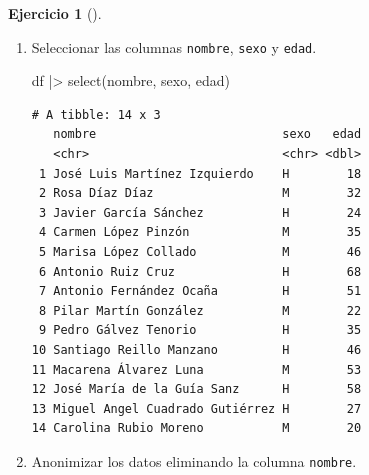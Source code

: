 \documentclass[
  a4paper,
]{scrreport}
\newenvironment{Shaded}{\begin{snugshade}}{\end{snugshade}}
\newcommand{\FunctionTok}[1]{\textcolor[rgb]{0.28,0.35,0.67}{#1}}
\newcommand{\NormalTok}[1]{\textcolor[rgb]{0.00,0.23,0.31}{#1}}
\newcommand{\SpecialCharTok}[1]{\textcolor[rgb]{0.37,0.37,0.37}{#1}}
\theoremstyle{definition}
\newtheorem{exercise}{Ejercicio}[chapter]
\theoremstyle{remark}
\begin{document}
\begin{exercise}[]
\begin{enumerate}
\begin{tcolorbox}
  \end{tcolorbox}
\item
  Seleccionar las columnas \texttt{nombre}, \texttt{sexo} y
  \texttt{edad}.

  \begin{tcolorbox}[enhanced jigsaw, coltitle=black, left=2mm, colback=white, leftrule=.75mm, toptitle=1mm, breakable, bottomrule=.15mm, titlerule=0mm, bottomtitle=1mm, title=\textcolor{quarto-callout-tip-color}{\faLightbulb}\hspace{0.5em}{Solución}, arc=.35mm, toprule=.15mm, rightrule=.15mm, colframe=quarto-callout-tip-color-frame, opacityback=0, colbacktitle=quarto-callout-tip-color!10!white, opacitybacktitle=0.6]

\begin{Shaded}
\begin{Highlighting}[]
\NormalTok{df }\SpecialCharTok{|\textgreater{}}
    \FunctionTok{select}\NormalTok{(nombre, sexo, edad)}
\end{Highlighting}
\end{Shaded}

\begin{verbatim}
# A tibble: 14 x 3
   nombre                          sexo   edad
   <chr>                           <chr> <dbl>
 1 José Luis Martínez Izquierdo    H        18
 2 Rosa Díaz Díaz                  M        32
 3 Javier García Sánchez           H        24
 4 Carmen López Pinzón             M        35
 5 Marisa López Collado            M        46
 6 Antonio Ruiz Cruz               H        68
 7 Antonio Fernández Ocaña         H        51
 8 Pilar Martín González           M        22
 9 Pedro Gálvez Tenorio            H        35
10 Santiago Reillo Manzano         H        46
11 Macarena Álvarez Luna           M        53
12 José María de la Guía Sanz      H        58
13 Miguel Angel Cuadrado Gutiérrez H        27
14 Carolina Rubio Moreno           M        20
\end{verbatim}

  \end{tcolorbox}
\item
  Anonimizar los datos eliminando la columna \texttt{nombre}.

  \begin{tcolorbox}[enhanced jigsaw, coltitle=black, left=2mm, colback=white, leftrule=.75mm, toptitle=1mm, breakable, bottomrule=.15mm, titlerule=0mm, bottomtitle=1mm, title=\textcolor{quarto-callout-tip-color}{\faLightbulb}\hspace{0.5em}{Solución}, arc=.35mm, toprule=.15mm, rightrule=.15mm, colframe=quarto-callout-tip-color-frame, opacityback=0, colbacktitle=quarto-callout-tip-color!10!white, opacitybacktitle=0.6]


\end{tcolorbox}
\end{enumerate}
\end{exercise}
\end{document}

